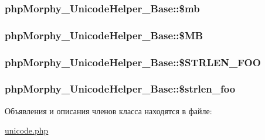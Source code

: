 \label{classphpMorphy__UnicodeHelper__Base_a967f83763bccb73c95e8878e579b26f6}
\hypertarget{classphpMorphy__UnicodeHelper__Base_a0765bdee56eb970e53d7c6c233ae7a6d}{
\subsubsection[{\$mb}]{\setlength{\rightskip}{0pt plus 5cm}phpMorphy\_\-UnicodeHelper\_\-Base::\$mb}}
\label{classphpMorphy__UnicodeHelper__Base_a0765bdee56eb970e53d7c6c233ae7a6d}
\hypertarget{classphpMorphy__UnicodeHelper__Base_a0185dc2ef8ff11cd5549d7caf3715b8f}{
\subsubsection[{\$MB}]{\setlength{\rightskip}{0pt plus 5cm}phpMorphy\_\-UnicodeHelper\_\-Base::\$MB}}
\label{classphpMorphy__UnicodeHelper__Base_a0185dc2ef8ff11cd5549d7caf3715b8f}
\hypertarget{classphpMorphy__UnicodeHelper__Base_a0e45243bbd4f509650c9f0df25993950}{
\subsubsection[{\$STRLEN\_\-FOO}]{\setlength{\rightskip}{0pt plus 5cm}phpMorphy\_\-UnicodeHelper\_\-Base::\$STRLEN\_\-FOO}}
\label{classphpMorphy__UnicodeHelper__Base_a0e45243bbd4f509650c9f0df25993950}
\hypertarget{classphpMorphy__UnicodeHelper__Base_ae658a5cb8299d103d917948753605c7a}{
\subsubsection[{\$strlen\_\-foo}]{\setlength{\rightskip}{0pt plus 5cm}phpMorphy\_\-UnicodeHelper\_\-Base::\$strlen\_\-foo}}
\label{classphpMorphy__UnicodeHelper__Base_ae658a5cb8299d103d917948753605c7a}


Объявления и описания членов класса находятся в файле:\begin{DoxyCompactItemize}
\item 
\hyperlink{unicode_8php}{unicode.php}\end{DoxyCompactItemize}
